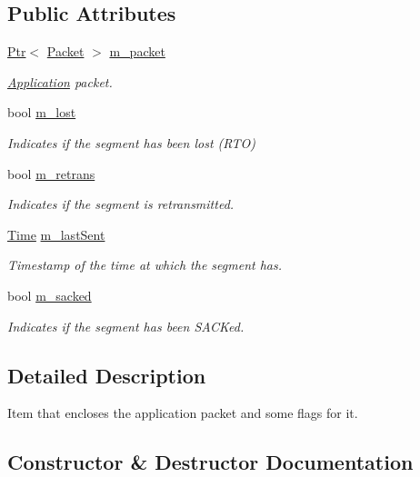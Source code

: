 \subsection*{Public Attributes}
\begin{DoxyCompactItemize}
\item 
\hyperlink{classns3_1_1Ptr}{Ptr}$<$ \hyperlink{classns3_1_1Packet}{Packet} $>$ \hyperlink{classns3_1_1TcpTxItem_addd21e6a843eb62c2e638962ea848918}{m\+\_\+packet}
\begin{DoxyCompactList}\small\item\em \hyperlink{classns3_1_1Application}{Application} packet. \end{DoxyCompactList}\item 
bool \hyperlink{classns3_1_1TcpTxItem_ad7e543719e0aacde056350f7376dca74}{m\+\_\+lost}
\begin{DoxyCompactList}\small\item\em Indicates if the segment has been lost (R\+TO) \end{DoxyCompactList}\item 
bool \hyperlink{classns3_1_1TcpTxItem_a15fa2c24263563070aec47c52ad70050}{m\+\_\+retrans}
\begin{DoxyCompactList}\small\item\em Indicates if the segment is retransmitted. \end{DoxyCompactList}\item 
\hyperlink{classns3_1_1Time}{Time} \hyperlink{classns3_1_1TcpTxItem_a750577092d6b0aa4f818652586f4351f}{m\+\_\+last\+Sent}
\begin{DoxyCompactList}\small\item\em Timestamp of the time at which the segment has. \end{DoxyCompactList}\item 
bool \hyperlink{classns3_1_1TcpTxItem_a07eed696a5ebcd8941ffbf515147bb14}{m\+\_\+sacked}
\begin{DoxyCompactList}\small\item\em Indicates if the segment has been S\+A\+C\+Ked. \end{DoxyCompactList}\end{DoxyCompactItemize}


\subsection{Detailed Description}
Item that encloses the application packet and some flags for it. 

\subsection{Constructor \& Destructor Documentation}
